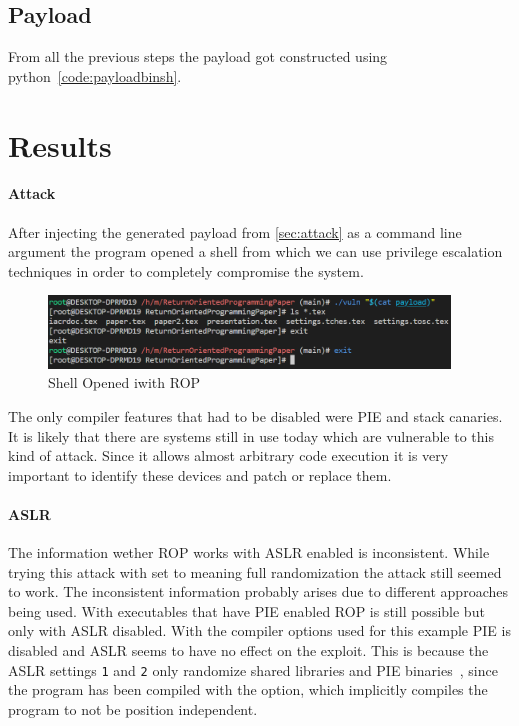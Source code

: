 \documentclass[journal=tosc,submission, notanonymous]{iacrtrans}
\begin{document}
\subsection{Payload}
From all the previous steps the payload got constructed using python~\cref{code:payloadbinsh}.
\section{Results}
\paragraph{Attack}
After injecting the generated payload from \cref{sec:attack} as a command line argument the program opened a shell from which we can use privilege escalation techniques in order to completely compromise the system.
\begin{figure}[h]
  \centering
  \includegraphics[width=0.95\textwidth]{ROPdone.png}
  \caption{Shell Opened iwith ROP}
  \label{fig:success}
\end{figure}
The only compiler features that had to be disabled were PIE and stack canaries. It is likely that there are systems still in use today which are vulnerable to this kind of attack. Since it allows almost arbitrary code execution it is very important to identify these devices and patch or replace them.
\paragraph{ASLR}
The information wether ROP works with ASLR enabled is inconsistent. While trying this attack with  set to  meaning full randomization the attack still seemed to work. The inconsistent information probably arises due to different approaches being used. With executables that have PIE enabled ROP is still possible but only with ASLR disabled. With the compiler options used for this example PIE is disabled and ASLR seems to have no effect on the exploit. This is because the ASLR settings \Verb+1+ and \Verb+2+ only randomize shared libraries and PIE binaries~\cite{rny}, since the program has been compiled with the  option, which implicitly compiles the program to not be position independent.
\end{document}
